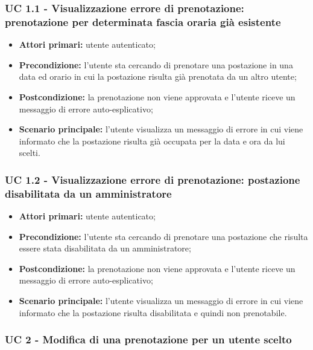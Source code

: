 \subsubsection{UC 1.1 - Visualizzazione errore di prenotazione: prenotazione per determinata fascia oraria già esistente}
\begin{itemize}
\item \textbf{Attori primari:} utente autenticato;
\item \textbf{Precondizione:} l'utente sta cercando di prenotare una postazione in una data ed orario in cui la postazione risulta già prenotata da un altro utente;
\item \textbf{Postcondizione:} la prenotazione non viene approvata e l'utente riceve un messaggio di errore auto-esplicativo;
\item \textbf{Scenario principale:} l'utente visualizza un messaggio di errore in cui viene informato che la postazione risulta già occupata per la data e ora da lui scelti.
\end{itemize}

\subsubsection{UC 1.2 - Visualizzazione errore di prenotazione: postazione disabilitata da un amministratore}
\begin{itemize}
\item \textbf{Attori primari:} utente autenticato;
\item \textbf{Precondizione:} l'utente sta cercando di prenotare una postazione che risulta essere stata disabilitata da un amministratore;
\item \textbf{Postcondizione:} la prenotazione non viene approvata e l'utente riceve un messaggio di errore auto-esplicativo;
\item \textbf{Scenario principale:} l'utente visualizza un messaggio di errore in cui viene informato che la postazione risulta disabilitata e quindi non prenotabile.
\end{itemize}


\subsubsection{UC 2 - Modifica di una prenotazione per un utente scelto}

